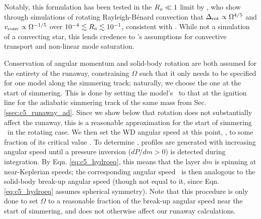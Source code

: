 


Notably, this formulation has been tested in the $\rossby \ll 1$ limit by \cite{barkdl14}, who show through simulations of rotating Rayleigh-B\'{e}nard convection that $\dnabrot \propto \Omega^{4/5}$ and $\vconv \propto \Omega^{-1/5}$ over $10^{-4} \lesssim \rossby \lesssim 10^{-1}$, consistent with \citeal{stev79}.  While not a simulation of a convecting star, this lends credence to \citeal{stev79}'s assumptions for convective transport and non-linear mode saturation.


Conservation of angular momentum and solid-body rotation are both assumed for the entirety of the runaway, constraining $\Omega$ such that it only needs to be specified for one model along the simmering track; naturally, we choose the one at the start of simmering.  This is done by setting the model's \Sc\ to that at the ignition line for the adiabatic simmering track of the same mass from Sec. \ref{ssec:c5_runaway_ad}.  Since we show below that rotation does not substantially affect the runaway, this is a reasonable approximation for the start of simmering \Sc\ in the rotating case.  We then set the WD angular speed at this point, \Ominit, to some fraction of its critical value \Omcrit.  To determine \Omcrit, profiles are generated with increasing angular speed until a pressure inversion ($dP/dm > 0$) is detected during integration.  By Eqn. \ref{eq:c5_hydroeq}, this means that the layer $dm$ is spinning at near-Keplerian speeds; the corresponding angular speed \Omcrit\ is then analogous to the solid-body break-up angular speed (though not equal to it, since Eqn. \ref{eq:c5_hydroeq} assumes spherical symmetry).  Note that this procedure is only done to set $\Omega$ to a reasonable fraction of the break-up angular speed near the start of simmering, and does not otherwise affect our runaway calculations.

